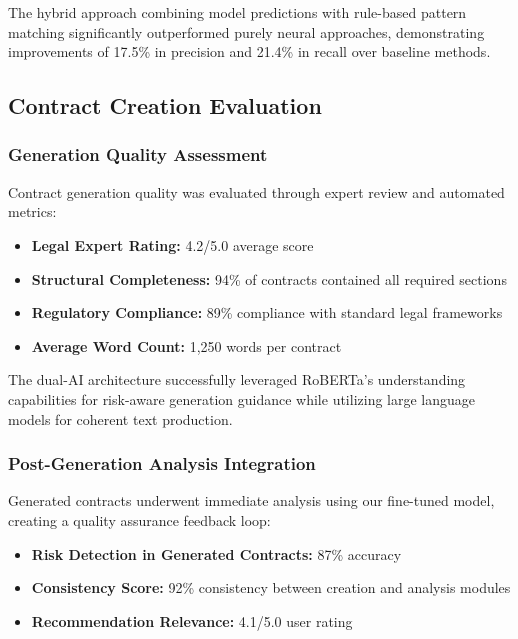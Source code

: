 The hybrid approach combining model predictions with rule-based pattern matching significantly outperformed purely neural approaches, demonstrating improvements of 17.5\% in precision and 21.4\% in recall over baseline methods.

\subsection{Contract Creation Evaluation}

\subsubsection{Generation Quality Assessment}

Contract generation quality was evaluated through expert review and automated metrics:

\begin{itemize}
    \item \textbf{Legal Expert Rating:} 4.2/5.0 average score
    \item \textbf{Structural Completeness:} 94\% of contracts contained all required sections
    \item \textbf{Regulatory Compliance:} 89\% compliance with standard legal frameworks
    \item \textbf{Average Word Count:} 1,250 words per contract
\end{itemize}

The dual-AI architecture successfully leveraged RoBERTa's understanding capabilities for risk-aware generation guidance while utilizing large language models for coherent text production.

\subsubsection{Post-Generation Analysis Integration}

Generated contracts underwent immediate analysis using our fine-tuned model, creating a quality assurance feedback loop:

\begin{itemize}
    \item \textbf{Risk Detection in Generated Contracts:} 87\% accuracy
    \item \textbf{Consistency Score:} 92\% consistency between creation and analysis modules
    \item \textbf{Recommendation Relevance:} 4.1/5.0 user rating
\end{itemize}

